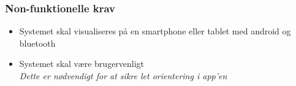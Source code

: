 \subsubsection{Non-funktionelle krav}

\begin{itemize}
\item Systemet skal visualiseres på en smartphone eller tablet med android og bluetooth
\item Systemet skal være brugervenligt
	\\
	\textit{Dette er nødvendigt for at sikre let orientering i app'en}
\end{itemize}



%
%
